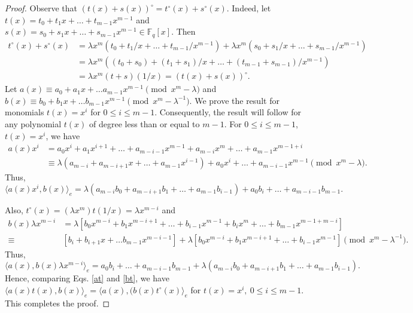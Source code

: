 \documentclass[12 pt]{extarticle}
\numberwithin{equation}{section}
\theoremstyle{definition}
\begin{document}
\begin{proof}
 Observe that $(t(x)+s(x))^{\circ}=t^{\circ}(x)+s^{\circ}(x)$. Indeed, let $t(x)=t_0+t_1x+\dots+t_{m-1}x^{m-1}$ and $s(x)=s_0+s_1x+\dots+s_{m-1}x^{m-1}\in \mathbb{F}_q[x]$. Then \begin{equation*}
     \begin{split}
        t^{\circ}(x)+s^{\circ}(x)&=\lambda x^m(t_0+t_1/x+\dots+t_{m-1}/x^{m-1})+\lambda x^m(s_0+s_1/x+\dots+s_{m-1}/x^{m-1})\\
        &=\lambda x^m((t_0+s_0)+(t_1+s_1)/x+\dots+(t_{m-1}+s_{m-1})/x^{m-1})\\
        &=\lambda x^m (t+s)(1/x)=(t(x)+s(x))^{\circ}.
     \end{split}
 \end{equation*} 
 Let $a(x) \equiv a_0+a_1x+\dots a_{m-1}x^{m-1}\pmod{x^m-\lambda}$ and $b(x) \equiv b_0+b_1x+\dots b_{m-1}x^{m-1}\pmod{x^m-\lambda^{-1}}$. We prove the result for monomials $t(x)=x^i$ for $0\leq i\leq m-1$. Consequently, the result will follow for any polynomial $t(x)$ of degree less than or equal to $m-1$. For $0\leq i\leq m-1$, $t(x)=x^i$, we have 
    \begin{equation*}
        \begin{split}
            a(x)x^i&=a_0x^i+a_1x^{i+1}+\dots+a_{m-i-1}x^{m-1}+a_{m-i}x^m+\dots+a_{m-1}x^{m-1+i}\\
            &\equiv \lambda (a_{m-i}+a_{m-i+1}x+\dots+a_{m-1}x^{i-1})+a_0x^i+\dots+a_{m-i-1}x^{m-1}\pmod{x^m-\lambda}.
        \end{split}
    \end{equation*}
    Thus, \begin{equation}\label{at}
        \langle a(x)x^i, b(x)\rangle_e=\lambda (a_{m-i}b_0+a_{m-i+1}b_1+\dots+a_{m-1}b_{i-1})+a_0b_i+\dots+a_{m-i-1}b_{m-1}.
    \end{equation}

     Also, $t^{\circ}(x)=(\lambda x^m)t(1/x)=\lambda x^{m-i}$ and
     \begin{equation*}
        \begin{split}
            b(x)\lambda x^{m-i}&=\lambda[b_0x^{m-i}+b_1x^{m-i+1}+\dots+b_{i-1}x^{m-1}+b_ix^m+\dots+b_{m-1}x^{m-1+m-i}]\\
            \equiv &[b_i+b_{i+1}x+\dots b_{m-1}x^{m-i-1}]+\lambda[b_0x^{m-i}+b_1x^{m-i+1}+\dots+ b_{i-1}x^{m-1}] \pmod{x^m-\lambda^{-1}}.
        \end{split}
    \end{equation*}
    Thus,
\begin{equation}\label{bt}
    \langle a(x), b(x)\lambda x^{m-i}\rangle_e= a_0b_i+\dots+a_{m-i-1}b_{m-1}+\lambda (a_{m-i}b_0+a_{m-i+1}b_1+\dots+a_{m-1}b_{i-1}).
\end{equation}
Hence, comparing Eqs. \ref{at} and \ref{bt}, we have $\langle a(x)t(x),b(x)\rangle_e=\langle a(x), (b(x)t^{\circ}(x)\rangle_e$ for $t(x)=x^i,\ 0\leq i\leq m-1$. This completes the proof. \end{proof}
\end{document}
